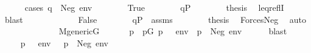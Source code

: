 \begin{isabellebody}
\ \ \ \ \isamarkupfalse%
\ {\isacharparenleft}{\kern0pt}cases\ {\isachardoublequoteopen}q\ {\isasymtturnstile}\ Neg{\isacharparenleft}{\kern0pt}{\isasymphi}{\isacharparenright}{\kern0pt}\ env{\isachardoublequoteclose}{\isacharparenright}{\kern0pt}\isanewline
\ \ \ \ \ \ \isamarkupfalse%
\ True\isanewline
\ \ \ \ \ \ \isamarkupfalse%
\ {\isacartoucheopen}q{\isasymin}P{\isacartoucheclose}\isanewline
\ \ \ \ \ \ \isamarkupfalse%
\ {\isacharquery}{\kern0pt}thesis\ \isamarkupfalse%
\ leq{\isacharunderscore}{\kern0pt}reflI\ \isamarkupfalse%
\ blast\isanewline
\ \ \ \ \isamarkupfalse%
\isanewline
\ \ \ \ \ \ \isamarkupfalse%
\ False\isanewline
\ \ \ \ \ \ \isamarkupfalse%
\ {\isacartoucheopen}q{\isasymin}P{\isacartoucheclose}\ \ assms\isanewline
\ \ \ \ \ \ \isamarkupfalse%
\ {\isacharquery}{\kern0pt}thesis\ \isamarkupfalse%
\ Forces{\isacharunderscore}{\kern0pt}Neg\ \isamarkupfalse%
\ auto\isanewline
\ \ \ \ \isamarkupfalse%
\isanewline
\ \ \isamarkupfalse%
\isanewline
\ \ \isamarkupfalse%
\isanewline
\ \ \isamarkupfalse%
\ {\isacartoucheopen}M{\isacharunderscore}{\kern0pt}generic{\isacharparenleft}{\kern0pt}G{\isacharparenright}{\kern0pt}{\isacartoucheclose}\isanewline
\ \ \isamarkupfalse%
\isanewline
\ \ \isamarkupfalse%
\ p\ \ {\isachardoublequoteopen}p{\isasymin}G{\isachardoublequoteclose}\ {\isachardoublequoteopen}{\isacharparenleft}{\kern0pt}p\ {\isasymtturnstile}\ {\isasymphi}\ env{\isacharparenright}{\kern0pt}\ {\isasymor}\ {\isacharparenleft}{\kern0pt}p\ {\isasymtturnstile}\ Neg{\isacharparenleft}{\kern0pt}{\isasymphi}{\isacharparenright}{\kern0pt}\ env{\isacharparenright}{\kern0pt}{\isachardoublequoteclose}\isanewline
\ \ \ \ \isamarkupfalse%
\ blast\isanewline
\ \ \isamarkupfalse%
\isanewline
\ \ \isamarkupfalse%
\ {\isacharparenleft}{\kern0pt}{}{\isacharparenright}{\kern0pt}\ {\isachardoublequoteopen}p\ {\isasymtturnstile}\ {\isasymphi}\ env{\isachardoublequoteclose}\ {\isacharbar}{\kern0pt}\ {\isacharparenleft}{\kern0pt}{}{\isacharparenright}{\kern0pt}\ {\isachardoublequoteopen}p\ {\isasymtturnstile}\ Neg{\isacharparenleft}{\kern0pt}{\isasymphi}{\isacharparenright}{\kern0pt}\ env{\isachardoublequoteclose}\ \isamarkupfalse%

\end{isabellebody}

